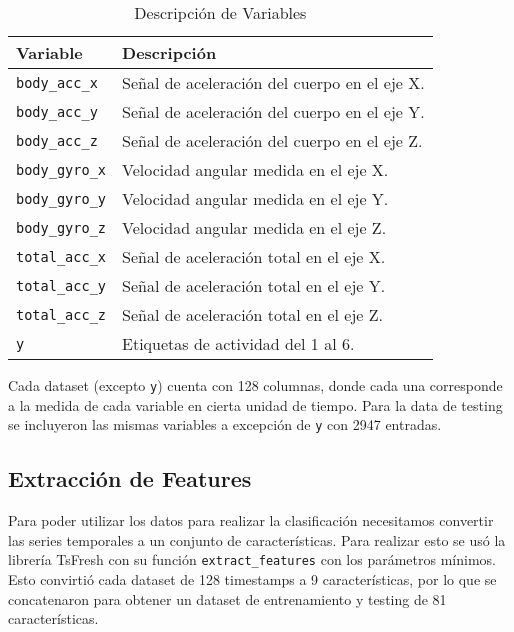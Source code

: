 \documentclass[conference]{IEEEtran}
\begin{document}
\begin{table}[htbp]
    \caption{Descripción de Variables}
    \begin{center}
        \begin{tabular}{|l|l|}
        \hline
        \textbf{Variable} & \textbf{Descripción} \\
        \hline
        \texttt{body\_acc\_x} & Señal de aceleración del cuerpo en el eje X.\\
        \hline
        \texttt{body\_acc\_y} & Señal de aceleración del cuerpo en el eje Y.\\
        \hline
        \texttt{body\_acc\_z} & Señal de aceleración del cuerpo en el eje Z.\\
        \hline
        \texttt{body\_gyro\_x} & Velocidad angular medida en el eje X.\\
        \hline
        \texttt{body\_gyro\_y} & Velocidad angular medida en el eje Y. \\
        \hline
        \texttt{body\_gyro\_z} & Velocidad angular medida en el eje Z. \\
        \hline
        \texttt{total\_acc\_x} & Señal de aceleración total en el eje X. \\
        \hline
        \texttt{total\_acc\_y} & Señal de aceleración total en el eje Y. \\
        \hline
        \texttt{total\_acc\_z} & Señal de aceleración total en el eje Z. \\
        \hline
        \texttt{y} & Etiquetas de actividad del 1 al 6. \\
        \hline
        \end{tabular}
        \label{tab1}
    \end{center}
\end{table}

Cada dataset (excepto \texttt{y}) cuenta con 128 columnas, donde cada una corresponde a la medida de cada variable en cierta unidad de tiempo.
Para la data de testing se incluyeron las mismas variables a excepción de \texttt{y} con 2947 entradas.

\subsection{Extracción de Features}
Para poder utilizar los datos para realizar la clasificación necesitamos convertir las series temporales a un conjunto de características. Para realizar esto se usó la librería TsFresh con su función \texttt{extract\_features} con los parámetros mínimos. Esto convirtió cada dataset de 128 timestamps a 9 características, por lo que se concatenaron para obtener un dataset de entrenamiento y testing de 81 características.
\end{document}
